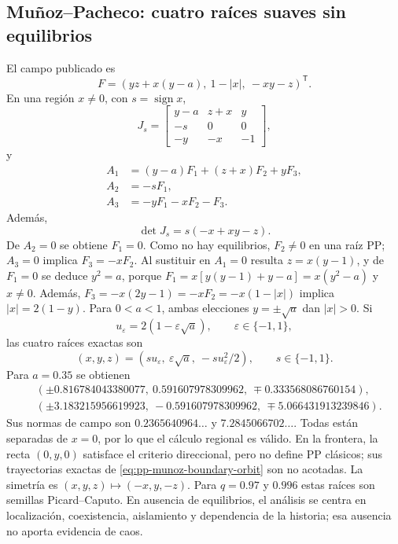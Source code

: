 \subsection{Muñoz--Pacheco: cuatro raíces suaves sin equilibrios}
\label{subsec:casegt-munoz}

El campo publicado es
\begin{equation}
 F=(yz+x(y-a),\ 1-|x|,\ -xy-z)^{\mathsf T}.
 \label{casegt:eq:munoz-field}
\end{equation}
En una región $x\ne0$, con $s=\operatorname{sign}x$,
\begin{equation}
 J_s=\begin{bmatrix}
 y-a&z+x&y\\
 -s&0&0\\
 -y&-x&-1
 \end{bmatrix},
 \label{casegt:eq:munoz-J}
\end{equation}
y
\begin{align}
 A_1&=(y-a)F_1+(z+x)F_2+yF_3,\nonumber\\
 A_2&=-sF_1,\\
 A_3&=-yF_1-xF_2-F_3.
 \label{casegt:eq:munoz-A}
\end{align}
Además,
\begin{equation}
 \det J_s=s(-x+xy-z).
 \label{casegt:eq:munoz-det}
\end{equation}
De $A_2=0$ se obtiene $F_1=0$. Como no hay equilibrios, $F_2\ne0$ en una
raíz PP; $A_3=0$ implica $F_3=-xF_2$. Al sustituir en $A_1=0$ resulta
$z=x(y-1)$, y de $F_1=0$ se deduce $y^2=a$, porque
$F_1=x[y(y-1)+y-a]=x(y^2-a)$ y $x\ne0$.
Además, $F_3=-x(2y-1)=-xF_2=-x(1-|x|)$ implica
$|x|=2(1-y)$. Para $0<a<1$, ambas elecciones $y=\pm\sqrt a$
dan $|x|>0$. Si
\begin{equation}
 u_\varepsilon=2(1-\varepsilon\sqrt a),
 \qquad \varepsilon\in\{-1,1\},
 \label{casegt:eq:munoz-u}
\end{equation}
las cuatro raíces exactas son
\begin{equation}
 (x,y,z)=
 (s u_\varepsilon,\ \varepsilon\sqrt a,\
 -s u_\varepsilon^2/2),
 \qquad s\in\{-1,1\}.
 \label{casegt:eq:munoz-PP}
\end{equation}
Para $a=0.35$ se obtienen
\begin{align}
 &(\pm0.816784043380077,\ 0.591607978309962,
 \ \mp0.333568086760154),\nonumber\\
 &(\pm3.183215956619923,\ -0.591607978309962,
 \ \mp5.066431913239846).
 \label{casegt:eq:munoz-PP-numeric}
\end{align}
Sus normas de campo son $0.2365640964\ldots$ y $7.2845066702\ldots$. Todas
están separadas de $x=0$, por lo que el cálculo regional es válido. En la
frontera, la recta $(0,y,0)$ satisface el criterio direccional, pero no define
PP clásicos; sus trayectorias exactas de \cref{eq:pp-munoz-boundary-orbit}
son no acotadas. La simetría
es $(x,y,z)\mapsto(-x,y,-z)$. Para $q=0.97$ y $0.996$ estas raíces son semillas
Picard--Caputo. En ausencia de equilibrios, el análisis se centra en
localización, coexistencia, aislamiento y dependencia de la historia; esa
ausencia no aporta evidencia de caos.

